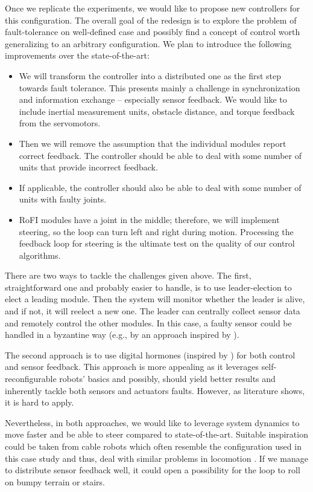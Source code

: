 Once we replicate the experiments, we would like to propose new controllers for
this configuration. The overall goal of the redesign is to explore the problem
of fault-tolerance on well-defined case and possibly find a concept of control
worth generalizing to an arbitrary configuration. We plan to introduce the
following improvements over the state-of-the-art:
\begin{itemize}
    \item We will transform the controller into a distributed one as the first
    step towards fault tolerance. This presents mainly a challenge in
    synchronization and information exchange -- especially sensor feedback. We
    would like to include inertial measurement units, obstacle distance, and
    torque feedback from the servomotors.
    \item Then we will remove the assumption that the individual
    modules report correct feedback. The controller should be able to deal with
    some number of units that provide incorrect feedback.
    \item If applicable, the controller should also be able to deal with some
    number of units with faulty joints.
    \item RoFI modules have a joint in the middle; therefore, we will implement
    steering, so the loop can turn left and right during motion. Processing the
    feedback loop for steering is the ultimate test on the quality of our
    control algorithms.
\end{itemize}

There are two ways to tackle the challenges given above. The first,
straightforward one and probably easier to handle, is to use leader-election
\cite{baca2016coordination} to elect a leading module. Then the system will
monitor whether the leader is alive, and if not, it will reelect a new one. The
leader can centrally collect sensor data and remotely control the
other modules. In this case, a faulty sensor could be handled in a byzantine way
(e.g., by an approach inspired by \textcite{DBLP:conf/osdi/CastroL99}).

The second approach is to use digital hormones (inspired by
\cite{DBLP:conf/cec/HamannSSC10, DBLP:conf/icra/MorenoG11}) for both control and
sensor feedback. This approach is more appealing as it leverages
self-reconfigurable robots' basics and possibly, should yield better results and
inherently tackle both sensors and actuators faults. However, as literature
shows, it is hard to apply.

Nevertheless, in both approaches, we would like to leverage system dynamics to
move faster and  be able to steer compared to state-of-the-art. Suitable
inspiration could be taken from cable robots which often resemble the
configuration used in this case study and thus, deal with similar problems in
locomotion \cite{DBLP:conf/iros/Hustig-SchultzS16, DBLP:conf/iros/CeraA18}. If
we manage to distribute sensor feedback well, it could open a possibility for
the loop to roll on bumpy terrain or stairs.


